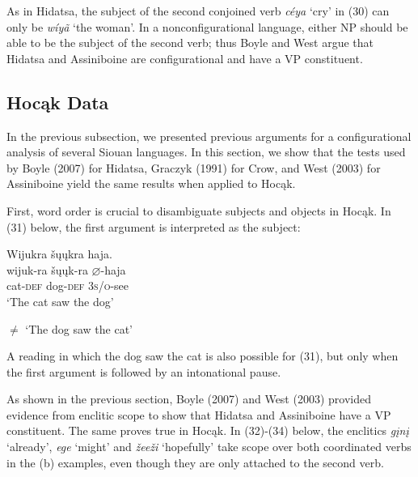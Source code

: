 \documentclass[output=paper]{LSP/langsci}
\begin{document}
As in Hidatsa, the subject of the second conjoined verb \textit{c\'eya} `cry' in (30) can only be \textit{w\'iy\~a} `the woman'.  In a nonconfigurational language, either NP should be able to be the subject of the second verb; thus Boyle and West argue that Hidatsa and Assiniboine are configurational and have a VP constituent.

\subsection{Hoc\k{a}k Data}

In the previous subsection, we presented previous arguments for a configurational analysis of several Siouan languages.  In this section, we show that the tests used by Boyle (2007) for Hidatsa, Graczyk (1991) for Crow, and West (2003) for Assiniboine yield the same results when applied to Hoc\k{a}k.
	
First, word order is crucial to disambiguate subjects and objects in Hoc\k{a}k.  In (31) below, the first argument is interpreted as the subject:

\begin{exe}
\ex 
\glll Wijukra	\v{s}\k{u}\k{u}kra 		haja.\\
wijuk-ra 		\v{s}\k{u}\k{u}k-ra 		$\varnothing$-haja \\
cat-\textsc{def} 		dog-\textsc{def} 	\textsc{3s/o}-see \\
\trans `The cat saw the dog'

$\neq$ `The dog saw the cat'
\end{exe}

A reading in which the dog saw the cat is also possible for (31), but only when the first argument is followed by an intonational pause.
	
As shown in the previous section, Boyle (2007) and West (2003) provided evidence from enclitic scope to show that Hidatsa and Assiniboine have a VP constituent.  The same proves true in Hoc\k{a}k.  In (32)-(34) below, the enclitics \textit{g\k{i}n\k{i}} `already', \textit{ege} `might' and \textit{\v{z}ee\v{z}i} `hopefully' take scope over both coordinated verbs in the (b) examples, even though they are only attached to the second verb.
\end{document}
